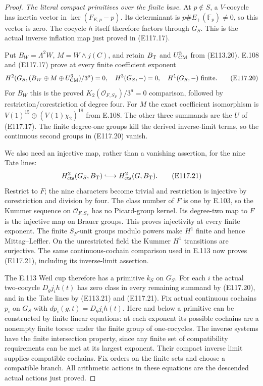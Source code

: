 \begin{proof}
\emph{The literal compact primitives over the finite base.}
At $p\notin S$, a $V$-cocycle has inertia vector in
$\ker(F_{E,p}-p)$.  Its determinant is
$p\#E_+(\mathbb F_p)\ne0$, so this vector is zero.
The cocycle $h$ itself therefore factors through $G_S$.
This is the actual inverse inflation map just proved in (E117.17).

Put $B_W=\Lambda^2W$, $M=W\wedge j(C)$, and retain
$B_{\rm T}$ and $U_{\rm CM}^3$ from (E113.20).
E.108 and (E117.17) prove at every finite coefficient exponent
\[
 H^2(G_S,(B_W\oplus M\oplus U_{\rm CM}^3)/3^a)=0,
 \quad H^3(G_S,-)=0,
 \quad H^1(G_S,-)\text{ finite}.
 \tag{E117.20}
\]
For $B_W$ this is the proved $K_2(\mathcal O_{F,S_F})/3^a=0$
comparison, followed by restriction/corestriction of degree four.
For $M$ the exact coefficient isomorphism is
$V(1)^{15}\oplus(V(1)\chi_2)^{18}$ from E.108.
The other three summands are the $U$ of (E117.17).
The finite degree-one groups kill the derived inverse-limit
terms, so the continuous second groups in (E117.20) vanish.

We also need an injective map, rather than a vanishing
assertion, for the nine Tate lines:
\[
 H^2_{\rm cts}(G_S,B_{\rm T})
          \lhook\joinrel\longrightarrow H^2_{\rm cts}(G,B_{\rm T}).
 \tag{E117.21}
\]
Restrict to $F$; the nine characters become trivial and
restriction is injective by corestriction and division by four.
The class number of $F$ is one by E.103, so the Kummer
sequence on $\mathcal O_{F,S_F}$ has no Picard-group kernel.
Its degree-two map to $F$ is the injective map on Brauer
groups.  This proves injectivity at every finite exponent.
The finite $S_F$-unit groups modulo powers make $H^1$
finite and hence Mittag--Leffler.  On the unrestricted field
the Kummer $H^1$ transitions are surjective.
The same continuous-cochain comparison used in E.113 now
proves (E117.21), including its inverse-limit assertion.

The E.113 Weil cup therefore has a primitive $k_S$ on $G_S$.
For each $i$ the actual two-cocycle
$D_g j_i h(t)$ has zero class in every remaining summand
by (E117.20), and in the Tate lines by (E113.21) and
(E117.21).  Fix actual continuous cochains $p_i$ on $G_S$
with $dp_i(g,t)=D_gj_i h(t)$.
Here and below a primitive can be constructed by finite
linear equations: at each exponent its possible cochains
are a nonempty finite torsor under the finite group of
one-cocycles.  The inverse systems have the finite
intersection property, since any finite set of compatibility
requirements can be met at its largest exponent.
Their compact inverse limit supplies compatible cochains.
Fix orders on the finite sets and choose a compatible branch.
All arithmetic actions in these equations are the descended
actual actions just proved.


\end{proof}
